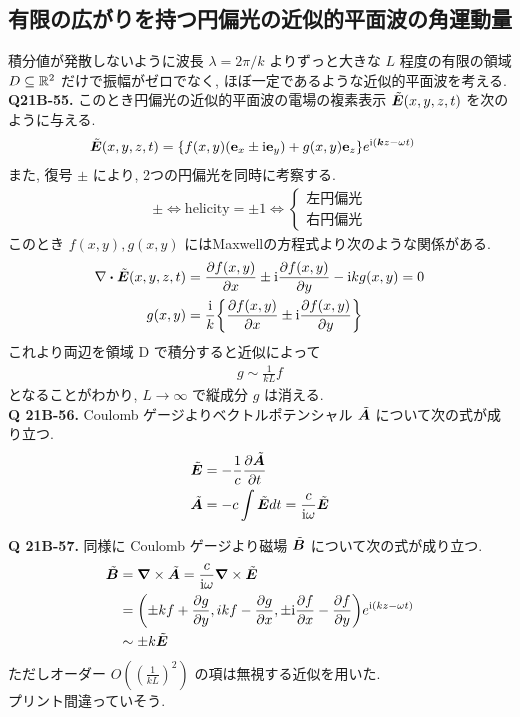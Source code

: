 \documentclass[uplatex,a4paper,dvipdfmx]{jsarticle}
\theoremstyle{definition}
\begin{document}
\subsection{有限の広がりを持つ円偏光の近似的平面波の角運動量}
積分値が発散しないように波長 $\lambda=2\pi/k$ よりずっと大きな $L$ 程度の有限の領域 $D\subseteq\RR^2$ だけで振幅がゼロでなく, ほぼ一定であるような近似的平面波を考える. \\

\textbf{Q21B-55.}
このとき円偏光の近似的平面波の電場の複素表示 $\ET(x,y,z,t)$ を次のように与える.
\begin{align}
  \ET(x,y,z,t) & = \qty{f(x,y)(\vb{e}_x\pm\ii\vb{e}_y) + g(x,y)\vb{e}_z}e^{\ii(\kk z-\omega t)} \label{def ET D}
\end{align}
また, 復号 $\pm$ により, 2つの円偏光を同時に考察する.
\begin{align}
  \pm\iff \mathrm{helicity} = \pm 1 \iff \begin{cases}
                                           左円偏光 \\
                                           右円偏光
                                         \end{cases}
\end{align}
このとき $f(x,y), g(x,y)$ にはMaxwellの方程式より次のような関係がある.
\begin{align}
  \nabla\vdot\ET(x,y,z,t) & = \pdv{f(x,y)}{x}\pm\ii\pdv{f(x,y)}{y} - \ii kg(x,y) = 0  \\
  g(x,y)                  & = \frac{\ii}{k}\qty{\pdv{f(x,y)}{x}\pm\ii\pdv{f(x,y)}{y}}
\end{align}
これより両辺を領域 D で積分すると近似によって
\begin{align}
  g\sim\frac{1}{kL}f
\end{align}
となることがわかり, $L\to\infty$ で縦成分 $g$ は消える. \\

\textbf{Q 21B-56.}
Coulomb ゲージよりベクトルポテンシャル $\tilde{\AA}$ について次の式が成り立つ.
\begin{align}
  \ET         & = -\frac{1}{c}\pdv{\tilde{\AA}}{t}      \\
  \tilde{\AA} & = -c\int\ET dt = \frac{c}{\ii\omega}\ET
\end{align}

\textbf{Q 21B-57.}
同様に Coulomb ゲージより磁場 $\tilde{\BB}$ について次の式が成り立つ.
\begin{align}
  \tilde{\BB} & = \vnabla\times\tilde{\AA} = \frac{c}{\ii\omega}\vnabla\times\ET                                \\
              & = \qty(\pm kf + \pdv{g}{y}, ikf -\pdv{g}{x}, \pm\ii\pdv{f}{x} - \pdv{f}{y})e^{\ii(kz-\omega t)} \\
              & \sim \pm k\ET
\end{align}
ただしオーダー $O((\frac{1}{kL})^2)$ の項は無視する近似を用いた. \\
プリント間違っていそう. \\
\end{document}
